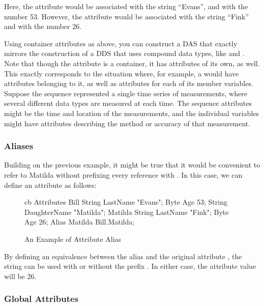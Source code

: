 \noindent
Here, the attribute  would be associated with the
string ``Evans'', and  with the number 53.  However, the
attribute  would be associated with the
string ``Fink'' and  with the number 26.  

Using container attributes as above, you can construct a DAS that
exactly mirrors the construction of a DDS that uses compound data
types, like  and . Note that though
the  attribute is a container, it has attributes of its own,
as well.  This exactly corresponds to the situation where, for
example, a  would have attributes belonging to it, as
well as attributes for each of its member variables.  Suppose the
sequence represented a single time series of measurements, where
several different data types are measured at each time.  The sequence
attributes might be the time and location of the measurements, and the
individual variables might have attributes describing the method or
accuracy of that measurement.

\subsubsection{Aliases}

Building on the previous example, it might be true that it would be
convenient to refer to Matilda without prefixing every reference with
.  In this case, we can define an  attribute
 as follows:

\begin{figure}[h]
\begin{vcode}{cb}
Attributes {
   Bill {
      String LastName "Evans";
      Byte Age 53;
      String DaughterName "Matilda";
      Matilda {
         String LastName "Fink";
         Byte Age 26;
      }
   }
   Alias Matilda Bill.Matilda;
}
\end{vcode}    
  \caption{An Example of Attribute Alias}
  \label{fig,das,alias}
\end{figure}

\noindent
By defining an equivalence between the alias  and the
original attribute , the string 
can be used with or without the prefix .  In either case,
the attribute value will be 26.

\subsubsection{Global Attributes}

